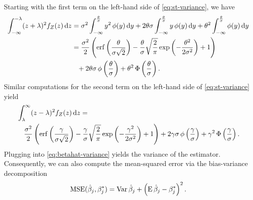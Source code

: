 Starting with the first term on the left-hand side of \eqref{eq:st-variance}, we have
\begin{equation}
  \label{eq:mc-var-part1}
  \begin{aligned}
    \int_{-\infty}^{-\lambda}(z+ \lambda)^2 f_Z(z) \mathop{}\!\mathrm{d} z & = \sigma^2 \int_{-\infty}^{\frac{\theta}{\sigma}} y^2 \operatorname{\phi}(y) \mathop{}\!\mathrm{d} y + 2 \theta \sigma \int_{-\infty}^{\frac{\theta}{\sigma}} y \operatorname{\phi}(y) \mathop{}\!\mathrm{d} y + \theta^2 \int_{-\infty}^{\frac{\theta}{\sigma}} \operatorname{\phi}(y) \mathop{}\!\mathrm{d} y \\
                                                         & = \frac{\sigma^2}{2} \left( \operatorname{erf}\left(\frac{\theta}{\sigma\sqrt{2}}\right) - \frac{\theta}{\sigma}\sqrt{\frac{2}{\pi}} \exp\left(-\frac{\theta^2}{2\sigma^2}\right) + 1 \right)                              \\
                                                         & \phantom{=} + 2 \theta \sigma \operatorname{\phi} \left(\frac{\theta}{\sigma}\right) + \theta^2 \operatorname{\Phi}\left(\frac{\theta}{\sigma}\right).
  \end{aligned}
\end{equation}
Similar computations for the second term on the left-hand side of \eqref{eq:st-variance} yield
\begin{equation}
  \label{eq:mc-var-part2}
  \begin{multlined}
    \int_{\lambda}^{\infty}(z - \lambda)^2 f_Z(z) \du z = \\
    \frac{\sigma^2}{2} \left( \erf\left(\frac{\gamma}{\sigma\sqrt{2}}\right) - \frac{\gamma}{\sigma}\sqrt{\frac{2}{\pi}} \exp\left(-\frac{\gamma^2}{2\sigma^2}\right) + 1 \right) + 2 \gamma \sigma \pdf \left(\frac{\gamma}{\sigma}\right) + \gamma^2 \cdf\left(\frac{\gamma}{\sigma}\right).
  \end{multlined}
\end{equation}
Plugging  into \eqref{eq:betahat-variance} yields the variance of the estimator. Consequently, we can also compute the mean-squared error via the bias-variance decomposition
\begin{equation}
  \label{eq:betahat-mse}
  \operatorname{MSE} (\hat\beta_j, \beta^*_j) = \operatorname{Var}\hat\beta_j + \left(\operatorname{E} \hat\beta_j - \beta^*_j\right)^2.
\end{equation}



